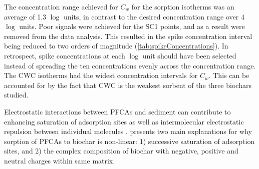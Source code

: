 The concentration range achieved for $C_w$ for the sorption isotherms was an average of 1.3 $\log$ units, in contrast to the desired concentration range over 4 $\log$ units. Poor signals were achieved for the SC1 points, and as a result were removed from the data analysis. This resulted in the spike concentration interval being reduced to two orders of magnitude (\cref{tab:spikeConcentrations}). In retrospect, spike concentrations at each $\log$ unit should have been selected instead of spreading the ten concentrations evenly across the concentration range. The CWC isotherms had the widest concentration intervals for $C_w$. This can be accounted for by the fact that CWC is the weakest sorbent of the three biochars studied.  

Electrostatic interactions between PFCAs and sediment can contribute to enhancing saturation of adsorption sites as well as intermolecular electrostatic repulsion between individual molecules \citep{higgins2006sorption,yin2022insights}. \cite{yin2022insights} presents two main explanations for why sorption of PFCAs to biochar is non-linear: 1) successive saturation of adsorption sites, and 2) the complex composition of biochar with negative, positive and neutral charges within same matrix. 

